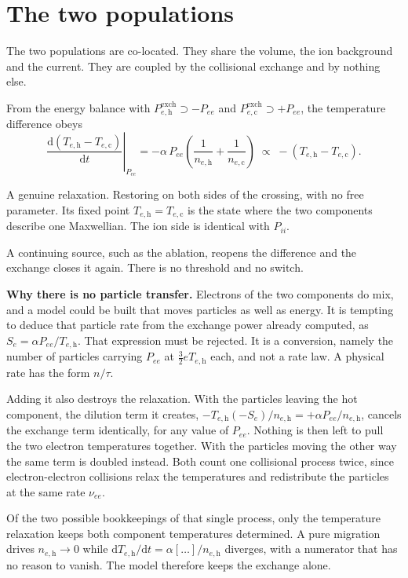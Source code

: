 \documentclass[11pt,a4paper]{article}
\newcommand{\dd}[2]{\frac{\mathrm{d}#1}{\mathrm{d}#2}}
\newcommand{\h}{\mathrm{h}}
\newcommand{\co}{\mathrm{c}}
\begin{document}
\section{The two populations}

The two populations are co-located. They share the volume, the ion background and the current.
They are coupled by the collisional exchange and by nothing else.

From the energy balance with $P^{\mathrm{exch}}_{e,\h} \supset -P_{ee}$ and
$P^{\mathrm{exch}}_{e,\co} \supset +P_{ee}$, the temperature difference obeys
\begin{equation}
\boxed{\;
  \left.\dd{\left(T_{e,\h} - T_{e,\co}\right)}{t}\right|_{P_{ee}}
    = -\alpha\, P_{ee} \left( \frac{1}{n_{e,\h}} + \frac{1}{n_{e,\co}} \right)
    \; \propto \; -\left(T_{e,\h} - T_{e,\co}\right) . \;}
\end{equation}

A genuine relaxation. Restoring on both sides of the crossing, with no free parameter. Its
fixed point $T_{e,\h} = T_{e,\co}$ is the state where the two components describe one
Maxwellian. The ion side is identical with $P_{ii}$.

A continuing source, such as the ablation, reopens the difference and the exchange closes it
again. There is no threshold and no switch.

\textbf{Why there is no particle transfer.} Electrons of the two components do mix, and a
model could be built that moves particles as well as energy. It is tempting to deduce that
particle rate from the exchange power already computed, as
$S_e = \alpha P_{ee} / T_{e,\h}$. That expression must be rejected. It is a conversion, namely
the number of particles carrying $P_{ee}$ at $\tfrac{3}{2} e T_{e,\h}$ each, and not a rate
law. A physical rate has the form $n/\tau$.

Adding it also destroys the relaxation. With the particles leaving the hot component, the
dilution term it creates,
$-T_{e,\h}(-S_e)/n_{e,\h} = +\alpha P_{ee}/n_{e,\h}$, cancels the exchange term identically,
for any value of $P_{ee}$. Nothing is then left to pull the two electron temperatures together.
With the particles moving the other way the same term is doubled instead. Both count one
collisional process twice, since electron-electron collisions relax the temperatures and
redistribute the particles at the same rate $\nu_{ee}$.

Of the two possible bookkeepings of that single process, only the temperature relaxation keeps
both component temperatures determined. A pure migration drives $n_{e,\h} \to 0$ while
$\mathrm{d}T_{e,\h}/\mathrm{d}t = \alpha [\dots]/n_{e,\h}$ diverges, with a numerator that has
no reason to vanish. The model therefore keeps the exchange alone.
\end{document}
